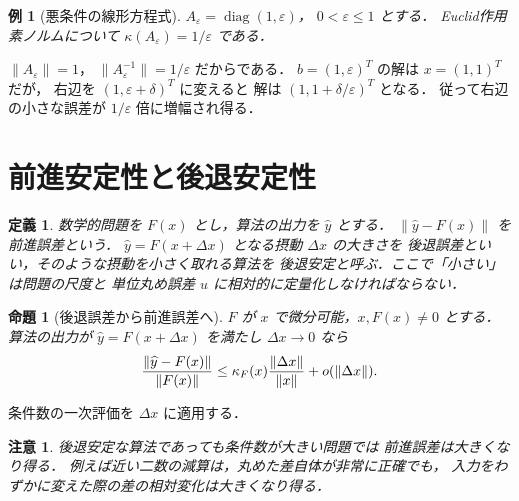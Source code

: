 \documentclass[a5paper,10pt,onecolumn]{jsarticle}
\makeatletter
\theoremstyle{mathnotetheorem}
\newtheorem{definition}[theorem]{定義}
\newtheorem{proposition}[theorem]{命題}
\newtheorem{example}[theorem]{例}
\newtheorem{remark}[theorem]{注意}
\renewcommand{\proofname}{証明}
\renewenvironment{proof}[1][\proofname]{%
  \par\pushQED{\qed}\normalfont\topsep4\p@\@plus2\p@\relax
  \trivlist\item[\hskip\labelsep\bfseries #1]\ignorespaces
}{\popQED\endtrivlist\@endpefalse}
\makeatother
\begin{document}
\begin{example}[悪条件の線形方程式]
$A_\varepsilon=\operatorname{diag}(1,\varepsilon)$，
$0<\varepsilon\le1$ とする．
Euclid作用素ノルムについて
$\kappa(A_\varepsilon)=1/\varepsilon$ である．
\end{example}
\begin{proof}
$\|A_\varepsilon\|=1$，
$\|A_\varepsilon^{-1}\|=1/\varepsilon$ だからである．
$b=(1,\varepsilon)^T$ の解は $x=(1,1)^T$ だが，
右辺を $(1,\varepsilon+\delta)^T$ に変えると
解は $(1,1+\delta/\varepsilon)^T$ となる．
従って右辺の小さな誤差が
$1/\varepsilon$ 倍に増幅され得る．
\end{proof}

\section{前進安定性と後退安定性}
\begin{definition}
数学的問題を $F(x)$ とし，算法の出力を $\widehat y$ とする．
$\|\widehat y-F(x)\|$ を前進誤差という．
$\widehat y=F(x+\Delta x)$ となる摂動 $\Delta x$ の大きさを
後退誤差といい，そのような摂動を小さく取れる算法を
後退安定と呼ぶ．ここで「小さい」は問題の尺度と
単位丸め誤差 $u$ に相対的に定量化しなければならない．
\end{definition}
\begin{proposition}[後退誤差から前進誤差へ]
$F$ が $x$ で微分可能，$x,F(x)\ne0$ とする．
算法の出力が $\widehat y=F(x+\Delta x)$ を満たし
$\Delta x\to0$ なら
\[
 {\|\widehat y-F(x)\|\over\|F(x)\|}
 \le\kappa_F(x){\|\Delta x\|\over\|x\|}
 +o(\|\Delta x\|).
\]
\end{proposition}
\begin{proof}
条件数の一次評価を $\Delta x$ に適用する．
\end{proof}
\begin{remark}
後退安定な算法であっても条件数が大きい問題では
前進誤差は大きくなり得る．
例えば近い二数の減算は，丸めた差自体が非常に正確でも，
入力をわずかに変えた際の差の相対変化は大きくなり得る．
\end{remark}
\end{document}
